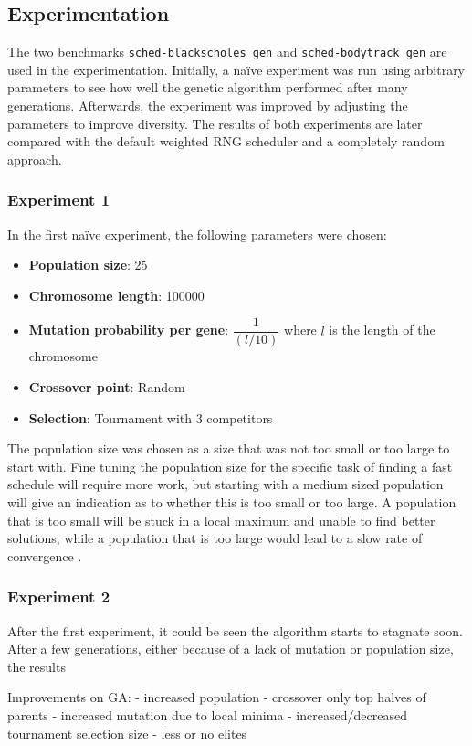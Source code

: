 \documentclass{article}
\begin{document}
\subsection{Experimentation}
The two benchmarks \texttt{sched-blackscholes_gen} and \texttt{sched-bodytrack_gen} are used in the experimentation. Initially, a na\"{i}ve experiment was run using arbitrary parameters to see how well the genetic algorithm performed after many generations. Afterwards, the experiment was improved by adjusting the parameters to improve diversity. The results of both experiments are later compared with the default weighted RNG scheduler and a completely random approach. 
\subsubsection{Experiment 1}
In the first na\"{i}ve experiment, the following parameters were chosen:
\begin{itemize}
\item \textbf{Population size}: 25
\item \textbf{Chromosome length}: 100000
\item \textbf{Mutation probability per gene}: $\dfrac{1}{(l/10)}$ where $l$ is the length of the chromosome
\item \textbf{Crossover point}: Random
\item \textbf{Selection}: Tournament with 3 competitors
\end{itemize}
The population size was chosen as a size that was not too small or too large to start with. Fine tuning the population size for the specific task of finding a fast schedule will require more work, but starting with a medium sized population will give an indication as to whether this is too small or too large. A population that is too small will be stuck in a local maximum and unable to find better solutions, while a population that is too large would lead to a slow rate of convergence \cite{ga-size}.
\subsubsection{Experiment 2}
After the first experiment, it could be seen the algorithm starts to stagnate soon. After a few generations, either because of a lack of mutation or population size, the results 

Improvements on GA:
- increased population
- crossover only top halves of parents
- increased mutation due to local minima
- increased/decreased tournament selection size
- less or no elites
\end{document}

